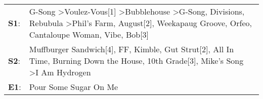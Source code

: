 \begin{supertabular}{p{0.03\textwidth}p{0.92\textwidth}}
 \textbf{S1}:  &  G-Song\textsuperscript{} \textgreater \enspace Voulez-Vous[1]\textsuperscript{} \textgreater \enspace Bubblehouse\textsuperscript{} \textgreater \enspace G-Song\textsuperscript{}, \enspace Divisions\textsuperscript{}, \enspace Rebubula\textsuperscript{} \textgreater \enspace Phil's Farm\textsuperscript{}, \enspace August[2]\textsuperscript{}, \enspace Weekapaug Groove\textsuperscript{}, \enspace Orfeo\textsuperscript{}, \enspace Cantaloupe Woman\textsuperscript{}, \enspace Vibe\textsuperscript{}, \enspace Bob[3]\textsuperscript{}  \enspace  \\
 \textbf{S2}:  &                                                                                                                                                                   Muffburger Sandwich[4]\textsuperscript{}, \enspace FF\textsuperscript{}, \enspace Kimble\textsuperscript{}, \enspace Gut Strut[2]\textsuperscript{}, \enspace All In Time\textsuperscript{}, \enspace Burning Down the House\textsuperscript{}, \enspace 10th Grade[3]\textsuperscript{}, \enspace Mike's Song\textsuperscript{} \textgreater \enspace I Am Hydrogen\textsuperscript{}  \enspace  \\
 \textbf{E1}:  &                                                                                                                                                                                                                                                                                                                                                                                                                                                                                                                  Pour Some Sugar On Me\textsuperscript{}  \enspace  \\
\end{supertabular}
